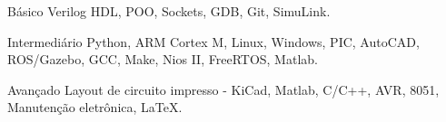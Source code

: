

\begin{cvskills}

  \cvskill
    {Básico} %
    {Verilog HDL, POO, Sockets, GDB, Git, SimuLink.} %

  \cvskill
    {Intermediário} %
    {Python, ARM Cortex M, Linux, Windows, PIC, AutoCAD, ROS/Gazebo, GCC, Make, Nios II, FreeRTOS, Matlab.} %

  \cvskill
    {Avançado} %
    {Layout de circuito impresso - KiCad, Matlab, C/C++, AVR, 8051, Manutenção eletrônica, LaTeX.} %

\end{cvskills}




